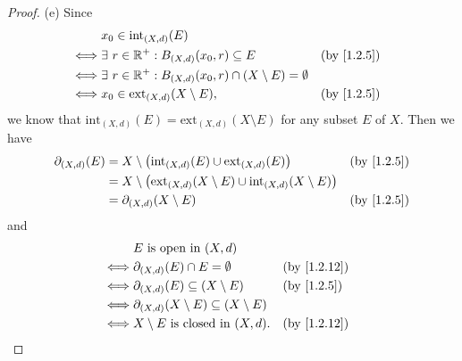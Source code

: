 \begin{proof}{(e)}
  Since
  \begin{align*}
         & x_0 \in \text{int}_{(X, d)}(E)                                                                          \\
    \iff & \exists\ r \in \R^+ : B_{(X, d)}(x_0, r) \subseteq E                      &  & \text{(by \cref{1.2.5})} \\
    \iff & \exists\ r \in \R^+ : B_{(X, d)}(x_0, r) \cap (X \setminus E) = \emptyset                               \\
    \iff & x_0 \in \text{ext}_{(X, d)}(X \setminus E),                               &  & \text{(by \cref{1.2.5})}
  \end{align*}
  we know that \(\text{int}_{(X, d)}(E) = \text{ext}_{(X, d)}(X \setminus E)\) for any subset \(E\) of \(X\).
  Then we have
  \begin{align*}
    \partial_{(X, d)}(E) & = X \setminus \big(\text{int}_{(X, d)}(E) \cup \text{ext}_{(X, d)}(E)\big)                         &  & \text{(by \cref{1.2.5})} \\
                         & = X \setminus \big(\text{ext}_{(X, d)}(X \setminus E) \cup \text{int}_{(X, d)}(X \setminus E)\big)                               \\
                         & = \partial_{(X, d)}(X \setminus E)                                                                 &  & \text{(by \cref{1.2.5})}
  \end{align*}
  and
  \begin{align*}
         & E \text{ is open in } (X, d)                                                              \\
    \iff & \partial_{(X, d)}(E) \cap E = \emptyset                    &  & \text{(by \cref{1.2.12})} \\
    \iff & \partial_{(X, d)}(E) \subseteq (X \setminus E)             &  & \text{(by \cref{1.2.5})}  \\
    \iff & \partial_{(X, d)}(X \setminus E) \subseteq (X \setminus E)                                \\
    \iff & X \setminus E \text{ is closed in } (X, d).                &  & \text{(by \cref{1.2.12})}
  \end{align*}
\end{proof}

